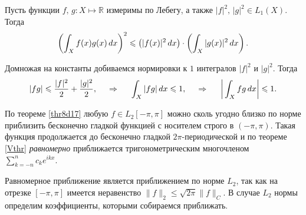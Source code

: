 


\textcolor{ugray}{
\begin{to_thr}
    Пусть функции $f,\, g \colon  X \mapsto \mathbb{R}$ измеримы по Лебегу, а также $|f|^2,\, |g|^2 \in L_1(X)$. Тогда
    \begin{equation*}
         \left(
            \int_X f(x) g(x) \, d x
         \right)^2 \leqslant \left(
            |f(x)|^2 \, d x
         \right) \cdot \left(
            \int_X |g(x)|^2 \, d x
         \right).
     \end{equation*} 
\end{to_thr}
}

\begin{uproof}
    Домножая на константы добиваемся нормировки к $1$ интегралов $|f|^2$ и $|g|^2$. Тогда 
    \begin{equation*}
        |fg| \leqslant \frac{|f|^2}{2} + \frac{|g|^2}{2},
        \hspace{0.5cm} \Rightarrow \hspace{0.5cm}
        \int_X |fg| \, d x \leqslant 1, \hspace{0.5cm} \Rightarrow \hspace{0.5cm}
        \bigg|
        \int_X fg \, d x
        \bigg| \leqslant 1.
    \end{equation*}
\end{uproof}

По теореме \ref{thr8d17} любую $f \in L_2[-\pi, \pi]$ можно сколь угодно близко по норме приблизить бесконечно гладкой функцией с носителем строго в $(-\pi, \pi)$. Такая функция продолжается до бесконечно гладкой $2\pi$-периодической и по теореме \ref{Vthr} \textit{равномерно} приближается тригонометрическим многочленом $\sum_{k=-n}^{n} c_k e^{ikx}$. 

Равномерное приближение является приближением по норме $L_2$, так как на отрезке $[-\pi, \pi]$ имеется неравенство $\|f\|_2 \leq \sqrt{2\pi} \|f\|_C$. В случае $L_2$ нормы определим коэффициенты, которыми собираемся приближать.


